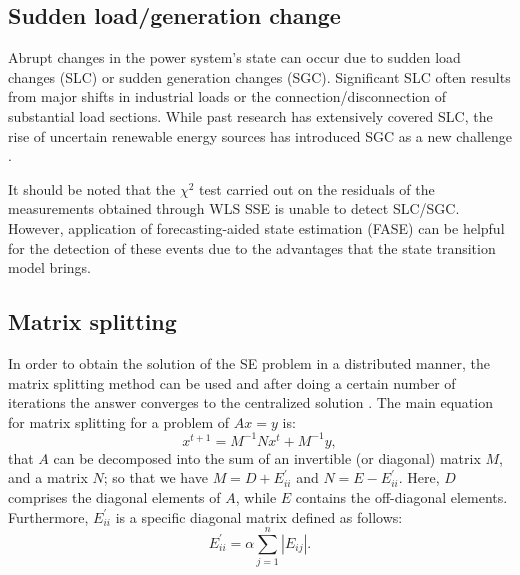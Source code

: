 \subsection{Sudden load/generation change}\label{subsec:ch1/sec4/sub5}
Abrupt changes in the power system's state can occur due to sudden load changes (SLC) or sudden generation changes (SGC). Significant SLC often results from major shifts in industrial loads or the connection/disconnection of substantial load sections. While past research has extensively covered SLC, the rise of uncertain renewable energy sources has introduced SGC as a new challenge \autocite{Nishiya_1982}.

It should be noted that the $\chi^2$ test carried out on the residuals of the measurements obtained through WLS SSE is unable to detect  SLC/SGC. However, application of forecasting-aided state estimation (FASE) can be helpful for the detection of these events due to the advantages that the state transition model brings.

\subsection{Matrix splitting}\label{subsec:ch1/sec4/sub6}

In order to obtain the solution of the SE problem in a distributed manner, the matrix splitting method can be used and after doing a certain number of iterations the answer converges to the centralized solution \autocite{7171105}. The main equation for matrix splitting for a problem of \(Ax = y\) is:
\begin{equation}
    x^{t+1}=M^{-1} N x^{t}+M^{-1} y,
    \label{eq:ms_maineq}
\end{equation}
that $A$ can be decomposed into the sum of an invertible (or diagonal) matrix $M$, and a matrix $N$; so that we have \(M = D+E^{'}_{ii}\) and \(N = E-E^{'}_{ii}\). Here, $D$ comprises the diagonal elements of $A$, while $E$ contains the off-diagonal elements. Furthermore, $E^{'}_{ii}$ is a specific diagonal matrix defined as follows:
\begin{equation}
    E_{i i}^{\prime}=\alpha \sum_{j=1}^{n}\left|E_{i j}\right|.
\end{equation}

